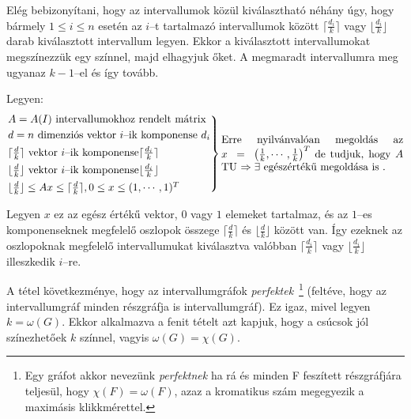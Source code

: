 Elég bebizonyítani, hogy az intervallumok közül kiválasztható néhány úgy, hogy
bármely $1 \leq i \leq n$ esetén az $i$--t tartalmazó intervallumok között
$\lceil \frac{d_i}{k} \rceil$ vagy $\lfloor \frac{d_i}{k} \rfloor$ darab
kiválasztott intervallum legyen. Ekkor a kiválasztott intervallumokat
megszínezzük egy színnel, majd elhagyjuk őket. A megmaradt intervallumra meg
ugyanaz $k-1$--el és így tovább.

Legyen:
\[\begin{rcases}
A=A(I) \mbox{ intervallumokhoz rendelt mátrix}\\
d = n \text{ dimenziós vektor } i \text{--ik komponense } d_i \\
\lceil \frac{d}{k} \rceil \text{ vektor } i \text{--ik komponense} \lceil \frac{d_i}{k} \rceil \\
\lfloor \frac{d}{k} \rfloor \text{ vektor } i \text{--ik komponense} \lfloor
\frac{d_i}{k} \rfloor \\
\lfloor \frac{d}{k} \rfloor \leq Ax \leq \lceil \frac{d}{k} \rceil, 0 \leq x
\leq (1,\cdots, 1)^T \end{rcases} \parbox[L]{6cm}{Erre nyilvánvalóan megoldás az
$x~=~\left( \frac{1}{k}, \cdots, \frac{1}{k} \right)^T$ de tudjuk, hogy $A$ TU
$\Rightarrow \exists$ egészértékű megoldása is .}
\]

Legyen $x$ ez az egész értékű vektor, $0$ vagy $1$ elemeket tartalmaz, és az
$1$--es komponenseknek megfelelő oszlopok összege $\lceil \frac{d}{k} \rceil$ és
$ \lfloor \frac{d}{k} \rfloor$ között van. Így ezeknek az oszlopoknak megfelelő
intervallumukat kiválasztva valóbban $\lceil \frac{d_i}{k} \rceil$ vagy $
\lfloor \frac{d_i}{k} \rfloor$ illeszkedik $i$--re.

A tétel következménye, hogy az intervallumgráfok \emph{perfektek}~\footnote{ Egy
gráfot akkor nevezünk \emph{perfektnek} ha rá és minden F feszített részgráfjára
teljesül, hogy $\chi(F) = \omega(F)$, azaz a kromatikus szám megegyezik a
maximásis klikkmérettel.} (feltéve, hogy az intervallumgráf minden részgráfja is
intervallumgráf). Ez igaz, mivel legyen $k=\omega(G)$. Ekkor alkalmazva a fenit
tételt azt kapjuk, hogy a csúcsok jól színezhetőek $k$ színnel, vagyis
$\omega(G)=\chi(G)$.